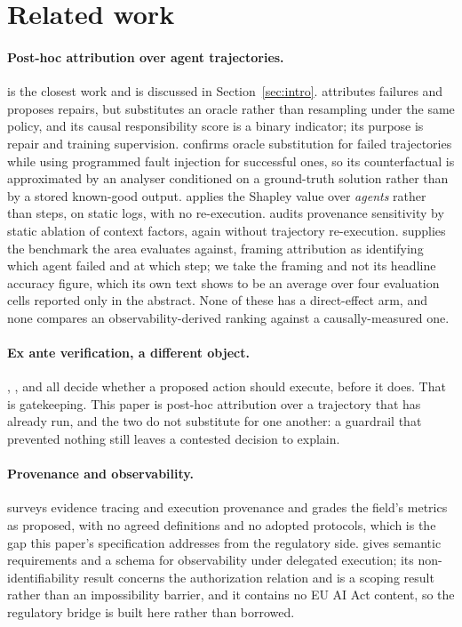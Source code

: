 \documentclass[11pt]{article}
\theoremstyle{remark}
\begin{document}
\section{Related work}
\label{sec:related}

\paragraph{Post-hoc attribution over agent trajectories.} \citet{car2026} is the
closest work and is discussed in Section~\ref{sec:intro}. \citet{causalflow2026}
attributes failures and proposes repairs, but substitutes an oracle rather than
resampling under the same policy, and its causal responsibility score is a binary
indicator; its purpose is repair and training supervision.
\citet{agentracer2025} confirms oracle substitution for failed trajectories while
using programmed fault injection for successful ones, so its counterfactual is
approximated by an analyser conditioned on a ground-truth solution rather than by
a stored known-good output. \citet{ma2025} applies the Shapley value over
\emph{agents} rather than steps, on static logs, with no re-execution.
\citet{liao2026} audits provenance sensitivity by static ablation of context
factors, again without trajectory re-execution. \citet{whoandwhen2025} supplies
the benchmark the area evaluates against, framing attribution as identifying
which agent failed and at which step; we take the framing and not its headline
accuracy figure, which its own text shows to be an average over four evaluation
cells reported only in the abstract. None of these has a direct-effect
arm, and none compares an observability-derived ranking against a
causally-measured one.

\paragraph{Ex ante verification, a different object.} \citet{civex2026},
\citet{ebte2026}, \citet{attriguard2026} and \citet{causalarmor2026} all decide
whether a proposed action should execute, before it does. That is gatekeeping. This
paper is post-hoc attribution over a trajectory that has already run, and the two
do not substitute for one another: a guardrail that prevented nothing still leaves
a contested decision to explain.

\paragraph{Provenance and observability.} \citet{survey2026} surveys evidence
tracing and execution provenance and grades the field's metrics as proposed, with
no agreed definitions and no adopted protocols, which is the gap this paper's
specification addresses from the regulatory side. \citet{delegated2026} gives
semantic requirements and a schema for observability under delegated execution;
its non-identifiability result concerns the authorization relation and is a
scoping result rather than an impossibility barrier, and it contains no EU AI Act
content, so the regulatory bridge is built here rather than borrowed.
\end{document}

